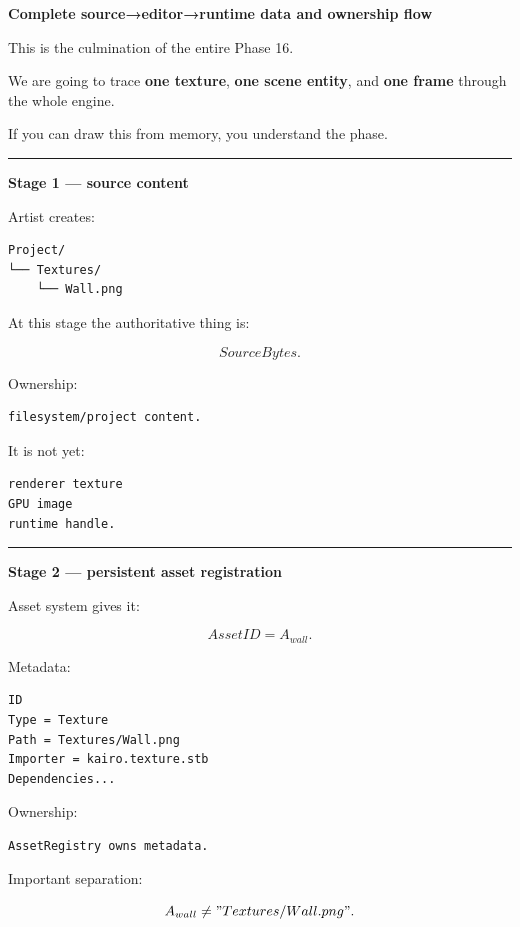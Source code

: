 \textbf{Complete source→editor→runtime data and ownership flow}

This is the culmination of the entire Phase 16.

We are going to trace \textbf{one texture}, \textbf{one scene entity}, and \textbf{one frame} through the whole engine.

If you can draw this from memory, you understand the phase.

\begin{center}\rule{0.5\linewidth}{0.5pt}\end{center}

\textbf{Stage 1 --- source content}

Artist creates:

\begin{verbatim}
Project/
└── Textures/
    └── Wall.png
\end{verbatim}

At this stage the authoritative thing is:

\[
SourceBytes.
\]

Ownership:

\begin{verbatim}
filesystem/project content.
\end{verbatim}

It is not yet:

\begin{verbatim}
renderer texture
GPU image
runtime handle.
\end{verbatim}

\begin{center}\rule{0.5\linewidth}{0.5pt}\end{center}

\textbf{Stage 2 --- persistent asset registration}

Asset system gives it:

\[
AssetID=A_{wall}.
\]

Metadata:

\begin{verbatim}
ID
Type = Texture
Path = Textures/Wall.png
Importer = kairo.texture.stb
Dependencies...
\end{verbatim}

Ownership:

\begin{verbatim}
AssetRegistry owns metadata.
\end{verbatim}

Important separation:

\[
A_{wall}
\neq
"Textures/Wall.png".
\]

